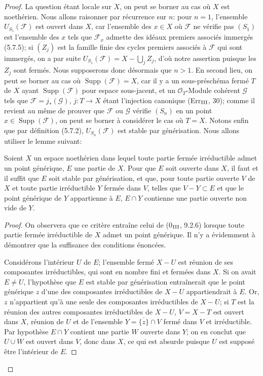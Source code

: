 \begin{proof}
La question étant locale sur $X$, on peut se borner au cas où $X$ est
noethérien. Nous allons raisonner par récurrence sur $n$: pour $n=1$,
l'ensemble $U_{S_1}(\mathcal F)$ est ouvert dans $X$, car l'ensemble des
$x\in X$ où $\mathcal F$ ne vérifie pas $(S_1)$ est l'ensemble des $x$ tels
que $\mathcal F_x$ admette des idéaux premiers associés immergés (5.7.5);
si $(Z_j)$ est la famille finie des cycles premiers associés à $\mathcal F$
qui sont immergés, on a par suite
$U_{S_1}(\mathcal F)=X-\bigcup_jZ_j$, d'où notre assertion puisque les
$Z_j$ sont fermés. Nous supposerons donc désormais que $n>1$. En second
lieu, on peut se borner au cas où
$\operatorname{Supp}(\mathcal F)=X$, car il y a un sous-préschéma fermé
$T$ de $X$ ayant $\operatorname{Supp}(\mathcal F)$ pour espace sous-jacent,
et un $\mathcal O_T$-Module cohérent $\mathcal G$ tels que
$\mathcal F=j_*(\mathcal G)$, $j:T\to X$ étant l'injection canonique
(Err$_{\rm III}$, 30); comme il revient au même de prouver que $\mathcal F$
ou $\mathcal G$ vérifie $(S_n)$ en un point
$x\in\operatorname{Supp}(\mathcal F)$, on peut se borner à considérer le
cas où $T=X$. Notons enfin que par définition (5.7.2),
$U_{S_n}(\mathcal F)$ est stable par générisation. Nous allons utiliser le
lemme suivant:

\begin{lemma}[6.11.6.1]
\label{IV.2.s6.11.6.1-fr}
Soient $X$ un espace noethérien dans lequel toute partie fermée irréductible
admet un point générique, $E$ une partie de $X$. Pour que $E$ soit ouverte
dans $X$, il faut et il suffit que $E$ soit stable par générisation, et que,
pour toute partie ouverte $V$ de $X$ et toute partie irréductible $Y$ fermée
dans $V$, telles que $V-Y\subset E$ et que le point générique de $Y$
appartienne à $E$, $E\cap Y$ contienne une partie ouverte non vide de $Y$.
\end{lemma}

\begin{proof}
On observera que ce critère entraîne celui de (0$_{\rm III}$, 9.2.6)
lorsque toute partie fermée irréductible de $X$ admet un point générique.
Il n'y a évidemment à démontrer que la suffisance des conditions énoncées.

Considérons l'intérieur $U$ de $E$; l'ensemble fermé $X-U$ est réunion de
ses composantes irréductibles, qui sont en nombre fini et fermées dans $X$.
Si on avait $E\ne U$, l'hypothèse que $E$ est stable par générisation
entraînerait que le point générique $z$ d'une des composantes irréductibles
de $X-U$ appartiendrait à $E$. Or, $z$ n'appartient qu'à une seule des
composantes irréductibles de $X-U$; si $T$ est la réunion des autres
composantes irréductibles de $X-U$, $V=X-T$ est ouvert dans $X$, réunion de
$U$ et de l'ensemble $Y=\overline{\{z\}}\cap V$ fermé dans $V$ et
irréductible. Par hypothèse $E\cap Y$ contient une partie $W$ ouverte dans
$Y$; on en conclut que $U\cup W$ est ouvert dans $V$, donc dans $X$, ce qui
est absurde puisque $U$ est supposé être l'intérieur de $E$.
\end{proof}


\end{proof}
